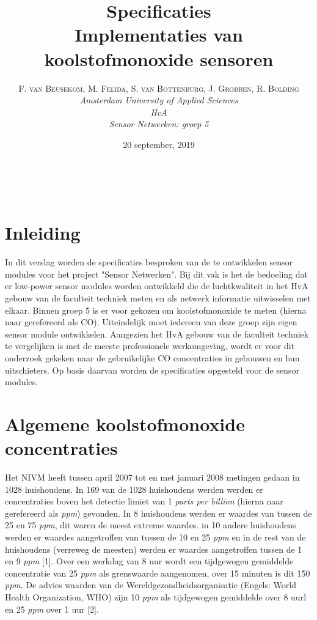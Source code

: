 \documentclass[a4paper, 11pt]{article} %
\title{\textbf{Specificaties}\\ %
Implementaties van koolstofmonoxide sensoren} %
\author{\textsc{F. van Beusekom, M. Felida, S. van Bottenburg, J. Grobben, R. Bolding} %
\\{\textit{Amsterdam University of Applied Sciences\\ 
HvA\\
Sensor Netwerken: groep 5}}} %
\date{20 september, 2019} %
\makeatletter
\renewcommand{\maketitle}{ %
\begin{flushright} %
{\LARGE\@title} %

\vspace{50pt} %

{\large\@author} %
\\\@date %

\vspace{40pt} %
\end{flushright}
}
\makeatother
\begin{document}
\captionsetup{justification=centering}
\hypersetup{hidelinks=true}
\maketitle %




\vspace{10pt} %

\newpage
\section{Inleiding}
In dit verslag worden de specificaties besproken van de te ontwikkelen sensor modules voor het project "Sensor Netwerken". Bij dit vak is het de bedoeling dat er low-power sensor modules worden ontwikkeld die de luchtkwaliteit in het HvA gebouw van de faculteit techniek meten en als netwerk informatie uitwisselen met elkaar. Binnen groep 5 is er voor gekozen om koolstofmonoxide te meten (hierna naar gerefereerd als CO). Uiteindelijk moet iedereen van deze groep zijn eigen sensor module ontwikkelen. Aangezien het HvA gebouw van de faculteit techniek te vergelijken is met de meeste professionele werkomgeving, wordt er voor dit onderzoek gekeken naar de gebruikelijke CO concentraties in gebouwen en hun uitschieters. Op basis daarvan worden de specificaties opgesteld voor de sensor modules.

\section{Algemene koolstofmonoxide concentraties}
Het NIVM heeft tussen april 2007 tot en met januari 2008 metingen gedaan in 1028 huishoudens. In 169 van de 1028 huishoudens werden werden er concentraties boven het detectie limiet van 1 \textit{parts per billion} (hierna naar gerefereerd als \textit{ppm}) gevonden. In 8 huishoudens werden er waardes van tussen de 25 en 75 \textit{ppm}, dit waren de meest extreme waardes. in 10 andere huishoudens werden er waardes aangetroffen van tussen de 10 en 25 \textit{ppm} en in de rest van de huishoudens (verreweg de meesten) werden er waardes aangetroffen tussen de 1 en 9 \textit{ppm} [1]. Over een werkdag van 8 uur wordt een tijdgewogen gemiddelde concentratie van 25 \textit{ppm} als grenswaarde aangenomen, over 15 minuten is dit 150 \textit{ppm}. De advies waarden van de Wereldgezondheidsorganisatie (Engels: World Health Organization, WHO) zijn 10 \textit{ppm} als tijdgewogen gemiddelde over 8 uurl en 25 \textit{ppm} over 1 uur [2].
\end{document}

